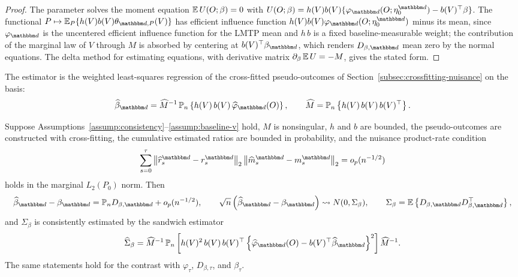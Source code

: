\documentclass[11pt]{article}
\begin{document}
\begin{proof}
The parameter solves the moment equation
\(\mathbb{E}\,U(O;\beta)=0\) with
\(U(O;\beta)=h(V)b(V)\{\varphi_{\d}(O;\eta_0^{\d})-b(V)^\top\beta\}\). The
functional \(P\mapsto\E_P\{h(V)b(V)\theta_{\d,P}(V)\}\) has efficient influence
function \(h(V)b(V)\varphi_{\d}(O;\eta_0^{\d})\) minus its mean, since
\(\varphi_{\d}\) is the uncentered efficient influence function for the LMTP
mean and \(h\,b\) is a fixed baseline-measurable weight; the contribution of
the marginal law of \(V\) through \(M\) is absorbed by centering at
\(b(V)^\top\beta_{\d}\), which renders \(D_{\beta,\d}\) mean zero by the normal
equations. The delta method for estimating equations, with derivative matrix
\(\partial_\beta\,\mathbb{E}\,U=-M\), gives the stated form. 
\end{proof}

The estimator is the weighted least-squares regression of the cross-fitted
pseudo-outcomes of Section~\ref{subsec:crossfitting-nuisance} on the basis:
\[
  \widehat\beta_{\d}
  =
  \widehat M^{-1}
  \,
  \mathbb{P}_n
  \left\{
    h(V)\,b(V)\,
    \widehat\varphi_{\d}(O)
  \right\},
  \qquad
  \widehat M
  =
  \mathbb{P}_n
  \left\{
    h(V)\,b(V)\,b(V)^\top
  \right\}.
\]

\begin{theorem}
\label{thm:msm-projection-al}
Suppose Assumptions~\ref{assump:consistency}--\ref{assump:baseline-v} hold,
\(M\) is nonsingular, \(h\) and \(b\) are bounded, the pseudo-outcomes are
constructed with cross-fitting, the cumulative estimated ratios are bounded in
probability, and the nuisance product-rate condition
\[
  \sum_{s=0}^{\tau}
  \left\|
    \widehat r_s^{\d}-r_{s}^{\d}
  \right\|_{2}
  \left\|
    \widehat m_s^{\d}-m_{s}^{\d}
  \right\|_{2}
  =
  o_p(n^{-1/2})
\]
holds in the marginal \(L_2(P_0)\) norm. Then
\[
  \widehat\beta_{\d}
  -
  \beta_{\d}
  =
  \mathbb{P}_n D_{\beta,\d}
  +
  o_p(n^{-1/2}),
  \qquad
  \sqrt n
  \left(
    \widehat\beta_{\d}
    -
    \beta_{\d}
  \right)
  \rightsquigarrow
  N(0,\Sigma_\beta),
  \qquad
  \Sigma_\beta
  =
  \E
  \left\{
    D_{\beta,\d}
    D_{\beta,\d}^\top
  \right\},
\]
and \(\Sigma_\beta\) is consistently estimated by the sandwich estimator
\[
  \widehat\Sigma_\beta
  =
  \widehat M^{-1}
  \,
  \mathbb{P}_n
  \left[
    h(V)^2\,
    b(V)\,b(V)^\top
    \left\{
      \widehat\varphi_{\d}(O)
      -
      b(V)^\top
      \widehat\beta_{\d}
    \right\}^2
  \right]
  \widehat M^{-1}.
\]
The same statements hold for the contrast with \(\varphi_\tau\),
\(D_{\beta,\tau}\), and \(\beta_\tau\).
\end{theorem}
\end{document}

